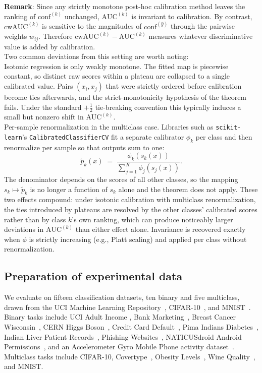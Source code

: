 \documentclass{article}
\theoremstyle{plain}
\theoremstyle{definition}
\theoremstyle{remark}
\begin{document}
{\bf{Remark}}: Since any strictly monotone post-hoc calibration method leaves the ranking of $\text{conf}^{(k)}$ unchanged, $\text{AUC}^{(k)}$ is invariant to calibration. By contrast, $\text{cwAUC}^{(k)}$ is sensitive to the magnitudes of $\text{conf}^{(\hat{y})}$ through the pairwise weights $w_{ij}$. Therefore $\text{cwAUC}^{(k)} - \text{AUC}^{(k)}$ measures whatever discriminative value is added by calibration. \\
Two common deviations from this setting are worth noting: \\
Isotonic regression is only weakly monotone. The fitted map is piecewise constant, so distinct raw scores within a plateau are collapsed to a single calibrated value. Pairs $(x_i, x_j)$ that were strictly ordered before calibration become ties afterwards, and the strict-monotonicity hypothesis of the theorem fails. Under the standard $+\tfrac{1}{2}$ tie-breaking convention this typically induces a small but nonzero shift in $\text{AUC}^{(k)}$. \\
Per-sample renormalization in the multiclass case. Libraries such as \texttt{scikit-learn}'s \texttt{CalibratedClassifierCV} fit a separate calibrator $\phi_k$ per class and then renormalize per sample so that outputs sum to one: \[
\tilde{p}_k(x) \;=\; \frac{\phi_k(s_k(x))}{\sum_{j=1}^{K} \phi_j(s_j(x))}. 
\] The denominator depends on the scores of all other classes, so the mapping $s_k \mapsto \tilde{p}_k$ is no longer a function of $s_k$ alone and the theorem does not apply.
These two effects compound: under isotonic calibration with multiclass renormalization, the ties introduced by plateaus are resolved by the other classes' calibrated scores rather than by class $k$'s own ranking, which can produce noticeably larger deviations in $\text{AUC}^{(k)}$ than either effect alone. Invariance is recovered exactly when $\phi$ is strictly increasing (e.g., Platt scaling) and applied per class without renormalization.



\subsection{Preparation of experimental data} \label{expermentalData}

We evaluate on fifteen classification datasets, ten binary and five multiclass, drawn from the UCI Machine Learning Repository~\cite{dua2019uci}, CIFAR-10~\cite{krizhevsky2009learning}, and MNIST~\cite{lecun1998gradient}. Binary tasks include UCI Adult Income  \cite{uci_adult_income_1996}, Bank Marketing~\cite{uci_bank_marketing_2014}, Breast Cancer Wisconsin~\cite{uci_breast_cancer_1988}, CERN Higgs Boson~\cite{uci_higgs_2014}, Credit Card Default~\cite{uci_credit_approval_1987}, Pima Indians Diabetes~\cite{uci_diabetes_uci_aim94}, Indian Liver Patient Records~\cite{uci_liver_disorders_2016}, Phishing Websites~\cite{uci_phishing_websites_2012}, NATICUSdroid Android Permissions~\cite{uci_naticusdroid_2021}, and an Accelerometer Gyro Mobile Phone activity dataset~\cite{uci_accelerometer_2012}. Multiclass tasks include CIFAR-10, Covertype~\cite{uci_covertype_1998}, Obesity Levels~\cite{uci_obesity_2019}, Wine Quality~\cite{uci_wine_1992}, and MNIST.
\end{document}
